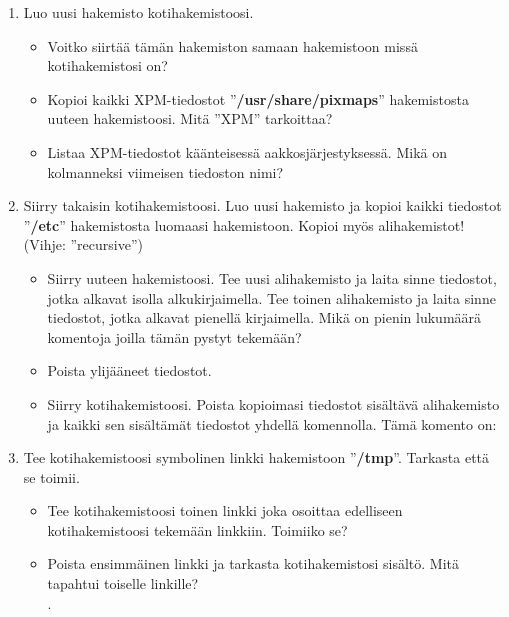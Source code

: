 \documentclass[12pt,portrait,a4]{article}
\begin{document}
\begin{enumerate}
\item Luo uusi hakemisto kotihakemistoosi.
	\begin{itemize}
	\item Voitko siirtää tämän hakemiston samaan hakemistoon missä kotihakemistosi on?
\hrulefill
	\item Kopioi kaikki XPM-tiedostot ''\textbf{/usr/share/pixmaps}'' hakemistosta uuteen
hakemistoosi.  Mitä ''XPM'' tarkoittaa? \hrulefill
	\item Listaa XPM-tiedostot käänteisessä aakkosjärjestyksessä. Mikä
on kolmanneksi viimeisen tiedoston nimi? \hrulefill

	\end{itemize}

\item Siirry takaisin kotihakemistoosi.  Luo uusi hakemisto ja kopioi kaikki
tiedostot ''\textbf{/etc}'' hakemistosta luomaasi hakemistoon.  Kopioi myös
alihakemistot!  (Vihje: ''recursive'')
	\begin{itemize}
	\item Siirry uuteen hakemistoosi.  Tee uusi alihakemisto ja laita
sinne tiedostot, jotka alkavat isolla alkukirjaimella.  Tee toinen
alihakemisto ja laita sinne tiedostot, jotka alkavat pienellä kirjaimella. 
Mikä on pienin lukumäärä komentoja joilla tämän pystyt tekemään?  \hrulefill
	\item Poista ylijääneet tiedostot.
	\item Siirry kotihakemistoosi.  Poista kopioimasi tiedostot
sisältävä alihakemisto ja kaikki sen sisältämät tiedostot yhdellä
komennolla.  Tämä komento on: \hrulefill
	\end{itemize}

\item Tee kotihakemistoosi symbolinen linkki hakemistoon ''\textbf{/tmp}''.  Tarkasta
että se toimii.
	\begin{itemize}
	\item Tee kotihakemistoosi toinen linkki joka osoittaa edelliseen kotihakemistoosi
tekemään linkkiin.  Toimiiko se? \hrulefill
	\item Poista ensimmäinen linkki ja tarkasta kotihakemistosi sisältö.
Mitä tapahtui toiselle linkille? \\ . \hrulefill
	\end{itemize}
\end{enumerate}
\end{document}
